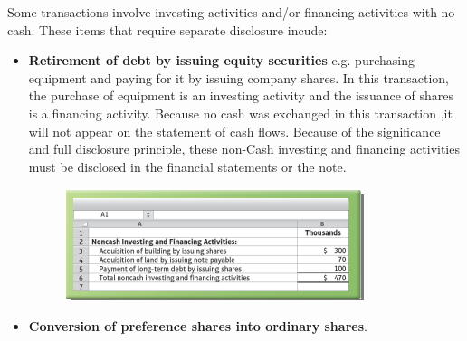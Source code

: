 \documentclass[../main.tex]{subfiles}
\begin{document}
	Some transactions involve investing activities and/or financing activities 
	with no cash. These items that require separate disclosure incude:
	\begin{itemize}[noitemsep]
		\item \textbf{Retirement of debt by issuing equity securities} e.g. 
		purchasing equipment and paying for it by issuing company shares. In 
		this transaction, the purchase of equipment is an investing activity 
		and the issuance of shares is a financing activity. Because no cash was 
		exchanged in this transaction ,it will not appear on the 
		statement of cash flows. Because of the significance and full 
		disclosure principle, these non-Cash investing and financing activities 
		must be disclosed in the financial statements or the note. 
		\begin{figure}[ht]
			\centering
			\includegraphics[width=0.9\columnwidth]{images/c10_noncash_investing_financing.png}
		\end{figure}
		\item \textbf{Conversion of preference shares into ordinary shares}. 
	\end{itemize}
\end{document}
